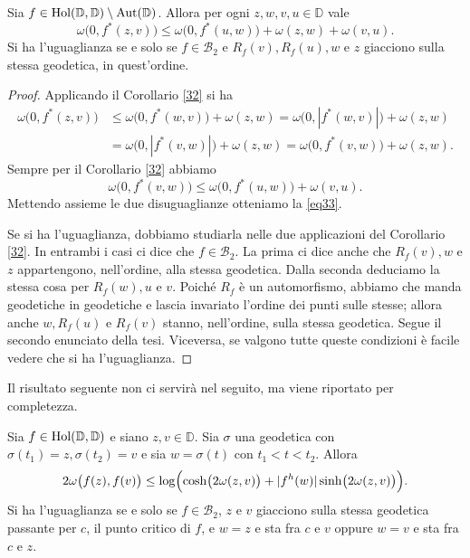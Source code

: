 \begin{cor} \label{33}
  Sia $f \in \text{\normalfont{Hol}}(\mathbb{D},\mathbb{D})\setminus\text{\normalfont{Aut}}(\mathbb{D})$. Allora per ogni $z, w, v, u \in \mathbb{D}$ vale
  \begin{equation} \label{eq33}
    \omega\bigl(0, f^*(z,v)\bigr) \le \omega\bigl(0, f^*(u,w)\bigr)+\omega(z,w)+\omega(v,u).
  \end{equation}
  Si ha l'uguaglianza se e solo se $f \in \mathcal{B}_2$ e $R_f(v), R_f(u), w$ e $z$ giacciono sulla stessa geodetica, in quest'ordine.
\end{cor}
\begin{proof}
  Applicando il Corollario \ref{32} si ha
  \begin{align*}
    \omega\bigl(0,f^*(z,v)\bigr) & \le \omega\bigl(0,f^*(w,v)\bigr)+\omega(z,w) =\omega\bigl(0,|f^*(w,v)|\bigr)+\omega(z,w) \\
    & =\omega\bigl(0,|f^*(v,w)|\bigr)+\omega(z,w)=\omega\bigl(0,f^*(v,w)\bigr)+\omega(z,w).
  \end{align*}
  Sempre per il Corollario \ref{32} abbiamo
  $$\omega\bigl(0,f^*(v,w)\bigr) \le \omega\bigl(0,f^*(u,w)\bigr)+\omega(v,u).$$
  Mettendo assieme le due disuguaglianze otteniamo la \eqref{eq33}.

  Se si ha l'uguaglianza, dobbiamo studiarla nelle due applicazioni del Corollario \ref{32}. In entrambi i casi ci dice che $f \in \mathcal{B}_2$. La prima ci dice anche che $R_f(v), w$ e $z$ appartengono, nell'ordine, alla stessa geodetica. Dalla seconda deduciamo la stessa cosa per $R_f(w), u$ e $v$. Poiché $R_f$ è un automorfismo, abbiamo che manda geodetiche in geodetiche e lascia invariato l'ordine dei punti sulle stesse; allora anche $w, R_f(u)$ e $R_f(v)$ stanno, nell'ordine, sulla stessa geodetica. Segue il secondo enunciato della tesi. Viceversa, se valgono tutte queste condizioni è facile vedere che si ha l'uguaglianza.
\end{proof}

Il risultato seguente non ci servirà nel seguito, ma viene riportato per completezza.

\begin{cor} \label{35}
  Sia $f \in \normalfont{\text{Hol}}(\mathbb{D},\mathbb{D})$ e siano $z, v \in \mathbb{D}$. Sia $\sigma$ una geodetica con $\sigma(t_1)=z, \sigma(t_2)=v$ e sia $w=\sigma(t)$ con $t_1<t<t_2$. Allora
  \begin{equation} \label{geod}
    2\omega\bigl(f(z),f(v)\bigr) \le \log\Bigl(\cosh\bigl(2\omega(z,v)\bigr)+|f^h(w)|\sinh\bigl(2\omega(z,v)\bigr)\Bigr).
  \end{equation}
  Si ha l'uguaglianza se e solo se $f \in \mathcal{B}_2$, $z$ e $v$ giacciono sulla stessa geodetica passante per $c$, il punto critico di $f$, e $w=z$ e sta fra $c$ e $v$ oppure $w=v$ e sta fra $c$ e $z$.
\end{cor}

